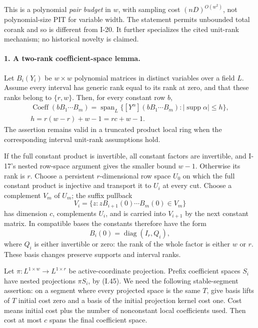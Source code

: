 \documentclass[11pt,a4paper]{article}
\theoremstyle{definition}\newtheorem{definition}{Definition}
\begin{document}
This is a polynomial \emph{pair budget} in $w$, with
sampling cost $(nD)^{O(w^2)}$, not polynomial-size PIT for
variable width.  The statement permits unbounded total
corank and so is different from I-20.  It further specializes
the cited unit-rank mechanism; no historical novelty is claimed.

\paragraph{1. A two-rank coefficient-space lemma.}
Let $B_i(Y_i)$ be $w\times w$ polynomial matrices in distinct
variables over a field $L$.  Assume every interval has generic
rank equal to its rank at zero, and that these ranks belong
to $\{r,w\}$.  Then, for every constant row $b$,
\[
 \begin{gathered}
 \operatorname{Coeff}(bB_1\cdots B_m)
 =\operatorname{span}_L\{
       [Y^\alpha](bB_1\cdots B_m):
       |\operatorname{supp}\alpha|\le h\},\\
 h=r(w-r)+w-1=rc+w-1.
 \end{gathered}
 \tag{I.44}
\]
The assertion remains valid in a truncated product local ring
when the corresponding interval unit-rank assumptions hold.

If the full constant product is invertible, all constant
factors are invertible, and I-17's nested row-space argument
gives the smaller bound $w-1$.  Otherwise its rank is $r$.
Choose a persistent $r$-dimensional row space $U_0$ on which
the full constant product is injective and transport it to
$U_i$ at every cut.  Choose a complement $V_m$ of $U_m$;
the suffix pullback
\[
 V_i=\{z:zB_{i+1}(0)\cdots B_m(0)\in V_m\}
\]
has dimension $c$, complements $U_i$, and is carried into
$V_{i+1}$ by the next constant matrix.  In compatible bases
the constants therefore have the form
\[
 B_i(0)=\operatorname{diag}(I_r,Q_i),
 \tag{I.45}
\]
where $Q_i$ is either invertible or zero: the rank of the
whole factor is either $w$ or $r$.  These basis changes
preserve supports and interval ranks.

Let $\pi:L^{1\times w}\to L^{1\times r}$ be active-coordinate
projection.  Prefix coefficient spaces $S_i$ have nested
projections $\pi S_i$, by (I.45).
We need the following stable-segment assertion: on a segment
where every projected space is the same $T$, give basis lifts
of $T$ initial cost zero and a basis of the initial projection
kernel cost one.  Cost means initial cost plus the number of
nonconstant local coefficients used.  Then cost at most $c$
spans the final coefficient space.
\end{document}
